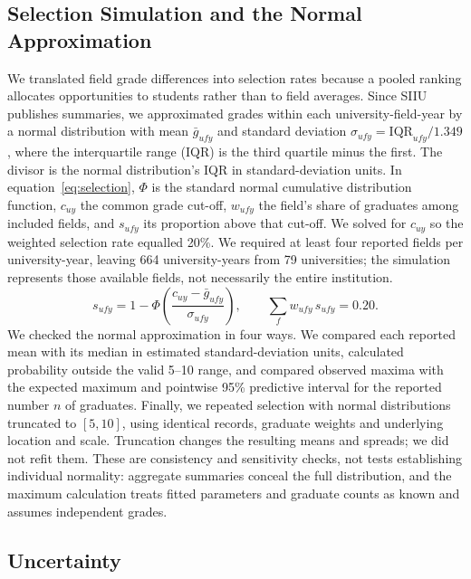 \subsection{Selection Simulation and the Normal Approximation}
\label{sec:methods-simulation}

We translated field grade differences into selection rates because a pooled ranking allocates opportunities to students rather than to field averages. Since SIIU publishes summaries, we approximated grades within each university-field-year by a normal distribution with mean $\bar g_{ufy}$ and standard deviation $\sigma_{ufy}=\mathrm{IQR}_{ufy}/1.349$, where the interquartile range (IQR) is the third quartile minus the first. The divisor is the normal distribution's IQR in standard-deviation units. In equation~\eqref{eq:selection}, $\Phi$ is the standard normal cumulative distribution function, $c_{uy}$ the common grade cut-off, $w_{ufy}$ the field's share of graduates among included fields, and $s_{ufy}$ its proportion above that cut-off. We solved for $c_{uy}$ so the weighted selection rate equalled 20\%. We required at least four reported fields per university-year, leaving 664 university-years from 79 universities; the simulation represents those available fields, not necessarily the entire institution.
\begin{equation}
  s_{ufy} = 1-\Phi\!\left(\frac{c_{uy}-\bar g_{ufy}}{\sigma_{ufy}}\right),\qquad
  \sum_{f} w_{ufy}\, s_{ufy} = 0.20 .
  \label{eq:selection}
\end{equation}
We checked the normal approximation in four ways. We compared each reported mean with its median in estimated standard-deviation units, calculated probability outside the valid 5--10 range, and compared observed maxima with the expected maximum and pointwise 95\% predictive interval for the reported number $n$ of graduates. Finally, we repeated selection with normal distributions truncated to $[5,10]$, using identical records, graduate weights and underlying location and scale. Truncation changes the resulting means and spreads; we did not refit them. These are consistency and sensitivity checks, not tests establishing individual normality: aggregate summaries conceal the full distribution, and the maximum calculation treats fitted parameters and graduate counts as known and assumes independent grades.
\subsection{Uncertainty}
\label{sec:methods-uncertainty}

